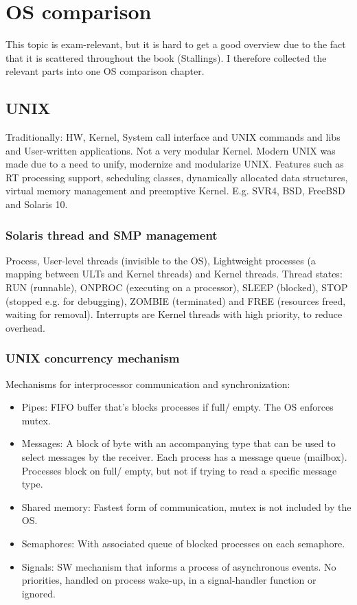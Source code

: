 \chapter{OS comparison}

This topic is exam-relevant, but it is hard to get a good overview due to the fact that it is scattered throughout the book (Stallings). I therefore collected the relevant parts into one OS comparison chapter.

\section{UNIX}
Traditionally: HW, Kernel, System call interface and UNIX commands and libs and User-written applications. Not a very modular Kernel.
Modern UNIX was made due to a need to unify, modernize and modularize UNIX. Features such as RT processing support, scheduling classes, dynamically allocated data structures, virtual memory management and preemptive Kernel. E.g. SVR4, BSD, FreeBSD and Solaris 10.

\subsection{Solaris thread and SMP management}
Process, User-level threads (invisible to the OS), Lightweight processes (a mapping between ULTs and Kernel threads) and Kernel threads. Thread states: RUN (runnable), ONPROC (executing on a processor), SLEEP (blocked), STOP (stopped e.g. for debugging), ZOMBIE (terminated) and FREE (resources freed, waiting for removal). Interrupts are Kernel threads with high priority, to reduce overhead.

\subsection{UNIX concurrency mechanism}
Mechanisms for interprocessor communication and synchronization:
\begin{itemize}
    \item Pipes: FIFO buffer that’s blocks processes if full/ empty. The OS enforces mutex.
    \item Messages: A block of byte with an accompanying type that can be used to select messages by the receiver. Each process has a message queue (mailbox). Processes block on full/ empty, but not if trying to read a specific message type.
    \item Shared memory: Fastest form of communication, mutex is not included by the OS.
    \item Semaphores: With associated queue of blocked processes on each semaphore.
    \item Signals: SW mechanism that informs a process of asynchronous events. No priorities, handled on process wake-up, in a signal-handler function or ignored.
\end{itemize}

